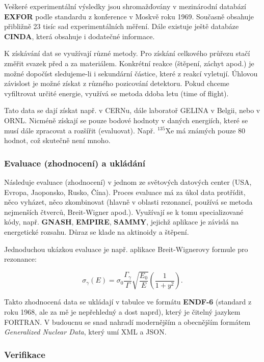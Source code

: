 Veškeré experimentální výsledky jsou shromažďovány v mezinárodní databází \textbf{EXFOR} podle standardu z konference v Moskvě roku 1969. Současně obsahuje přibližně 23 tisíc sad experimentálních měření. Dále existuje ještě databáze \textbf{CINDA}, která obsahuje i dodatečné informace. 

K získávání dat se využívají různé metody. Pro získání celkového průřezu stačí změřit svazek před a za materiálem. Konkrétní reakce (štěpení, záchyt apod.) je možné dopočíst sledujeme-li i sekundární částice, které z reakcí vyletují. Úhlovou závislost je možné získat z různého pozicování detektoru. Pokud chceme vyfiltrovat určité energie, využívá se metoda ddoba letu (time of flight).

Tato data se dají získat např. v CERNu, dále laboratoř GELINA v Belgii, nebo v ORNL. Nicméně získají se pouze bodové hodnoty v daných energiích, které se musí dále zpracovat a rozšířit (evaluovat). Např. $^{135}$Xe má známých pouze 80 hodnot, což skutečně není mnoho.

\subsubsection{Evaluace (zhodnocení) a ukládání}

Následuje evaluace (zhodnocení) v jednom ze světových datových center (USA, Evropa, Jaoponsko, Rusko, Čína). Proces evaluace má za úkol data protřídit, něco vyházet, něco zkombinovat (hlavně v oblasti rezonancí, používá se metoda nejmenších čtverců, Breit-Wigner apod.). Využívají se k tomu specializované kódy, např. \textbf{GNASH}, \textbf{EMPIRE}, \textbf{SAMMY}, jejichž aplikace je závislá na energetické rozsahu. Důraz se klade na aktinoidy a štěpení.

Jednoduchou ukázkou evaluace je např. aplikace Breit-Wignerovy formule pro rezonance:

\begin{equation}
  \sigma_\gamma(E) = \sigma_0 \dfrac{\Gamma_\gamma}{\Gamma} \sqrt{\dfrac{E_0}{E}} \left ( \dfrac{1}{1+y^2} \right ).
\end{equation}

Takto zhodnocená data se ukládají v tabulce ve formátu \textbf{ENDF-6} (standard z roku 1968, ale za mě je nepřehledný a dost naprd), který je čitelný jazykem FORTRAN. V budoucnu se snad  nahradí modernějším a obecnějším formátem \textit{Generalized Nuclear Data}, který umí XML a JSON.

\subsubsection{Verifikace}

